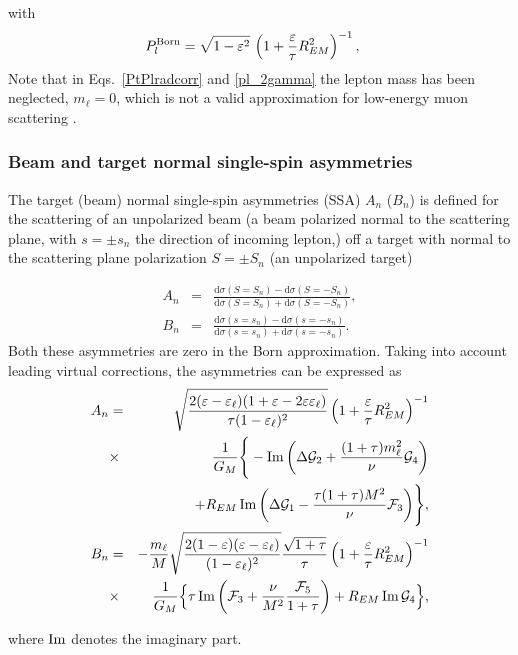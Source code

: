 with
\begin{align}
& P_l^\text{Born} = \sqrt{1 - \varepsilon^2} \, 
\left( 1 + \frac{\varepsilon}{\tau} R_{EM}^2 \right)^{-1}, 
\eqlab{pl_1gamma} 
\end{align}
Note that in Eqs.~\ref{PtPlradcorr} and \ref{pl_2gamma} the lepton mass has been neglected, $m_\ell=0$, which is not a valid approximation for low-energy muon scattering \cite{Tomalak:2016kyd}.



\subsubsection{Beam and target normal single-spin asymmetries}
\label{SSAintro}
The target (beam) normal single-spin asymmetries (SSA) $A_n$ ($B_n$) is defined for the scattering of an unpolarized beam (a beam polarized normal to the scattering plane, with $s= \pm s_n$ the direction of incoming lepton,) off a target with normal to the scattering plane polarization $S= \pm S_n$ (an unpolarized target) 

  \begin{eqnarray}
     A_n&=&\frac{\text{d} \sigma (S=S_n)-\text{d} \sigma (S=-S_n)}{\text{d} \sigma (S=S_n)+\text{d} \sigma (S=-S_n)},\\
     B_n&=&\frac{\text{d} \sigma (s=s_n)-\text{d} \sigma (s=-s_n)}{\text{d} \sigma (s=s_n)+\text{d} \sigma (s=-s_n)}.
 \end{eqnarray}
 Both these asymmetries are zero in the  Born  approximation. Taking into account leading virtual corrections, the  asymmetries can be expressed as~\cite{Gorchtein:2004ac,Chen:2004tw,Afanasev:2005prd}
 \begin{eqnarray}
A_n&=&\sqrt{\frac{2(\varepsilon -\varepsilon_\ell)(1+\varepsilon-2\varepsilon\varepsilon_\ell)}{\tau (1-\varepsilon_\ell)^2}}
\left(1 +\frac{\varepsilon}{\tau} R_{EM}^2 \right)^{-1} \nonumber\\
&\times& \frac{1}{G_M} \Bigg \{- \operatorname{Im} \bigg (\Delta {\cal G}_2+\frac{(1+\tau)m_\ell^2}{\nu}  {\cal G}_4\bigg ) \nonumber\\
&&+ R_{EM} \operatorname{Im} \bigg(\Delta {\cal G}_1-\frac{\tau (1+\tau) M^2}{\nu} {\cal F}_3 \bigg ) \Bigg \},\\
B_n&=& -\frac{m_\ell}{M} \sqrt{ \frac{2 (1-\varepsilon)(\varepsilon-\varepsilon_\ell)}{ (1-\varepsilon_\ell)^2}} \frac{\sqrt{1+\tau}}{\tau} 
\left(1+\frac{\varepsilon}{\tau} R_{EM}^2 \right)^{-1} \nonumber \\
&\times& \frac{1}{G_M} \Big \{\tau \operatorname{Im} \bigg( {\cal F}_3+\frac{\nu}{M^2}\frac{{\cal F}_5}{1+\tau} \bigg) + R_{EM} \operatorname{Im} {\cal G}_4 \Big \},\nonumber\\
\end{eqnarray}
 
where $\operatorname{Im}$ denotes the imaginary part. 

